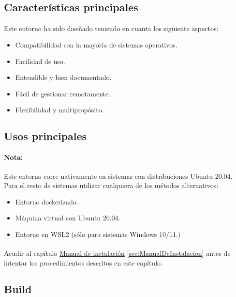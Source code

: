 \subsection{Características principales}

\paragraph{}Este entorno ha sido diseñado teniendo en cuanta los siguiente aspectos:

\begin{itemize}
    \item Compatibilidad con la mayoría de sistemas operativos.
    \item Facilidad de uso.
    \item Entendible y bien documentado.
    \item Fácil de gestionar remotamente.
    \item Flexibilidad y multipropósito.
\end{itemize}

\subsection{Usos principales}

\paragraph{Nota:} Este entorno corre nativamente en sistemas con distribuciones Ubuntu 20.04.
Para el resto de sistemas utilizar cualquiera de los métodos alternativos:

\begin{itemize}
    \item Entorno dockerizado.
    \item Máquina virtual con Ubuntu 20.04.
    \item Entorno en WSL2 (sólo para sistemas Windows 10/11.)
\end{itemize}

\paragraph{}Acudir al capítulo \hyperref[sec:ManualDeInstalacion]{Manual de instalación}
\ref{sec:ManualDeInstalacion} antes de intentar los procedimientos descritos en este
capítulo.

\subsection{Build}

